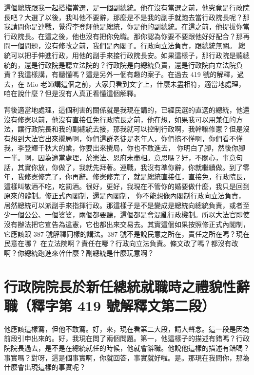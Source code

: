 \hypertarget{c08:cue:84}{}這個總統跟我一起搭檔當選，是一個副總統。他在沒有當選之前，他究竟是行政院長吧？大選了以後，我叫他不要辭，那麼是不是我的副手就跑去當行政院長呢？那我請問你是連戰，覺得李登輝他是總統，你是他的副總統。在這之前，他提拔你當行政院長。在這之後，他也沒有把你免職。那你認為你要不要跟他好好配合？那再問一個問題，沒有修改之前，我們是內閣子。行政向立法負責，跟總統無關。
\hypertarget{c08:cue:85}{}總統可以把手伸進行政，用他的副手來接行政院長安。如果這樣子，那行政院是聽總統的，還是行政院是聽立法院的？行政院是向總統負責，還是行政院向立法院負責？我這樣講，有聽懂嗎？這是另外一個有趣的案子。在過去 419 號的解釋，過去，在 Mio 老師講這個之前，大家只看到文字上，什麼未盡相符，適當地處理，咱在說什麼？但是沒有人真正看懂這個解釋。

\hypertarget{c08:cue:86}{}背後適當地處理，這個利害的關係就是我現在講的，已經民選的直選的總統，他還沒有修憲以前，他沒有直接任免行政院長之前，他在想，如果我可以用兼任的方法，讓行政院長和我的副總統去接，那我就可以控制行政啊，我幹嘛修憲？但是沒有想到大法官出來攪局啊，你們這群老徒是老年人，你們搞不懂啊，你們看不懂我，李登輝千秋大的業，你要出來攪局，你也不敢進去，
\hypertarget{c08:cue:87}{}你明白了腳，然後你腳一半。啊，因為適當處理，於憲法、恩府未盡相。意思嗎？好，不關心，事意句話，其實你放，你做了，我就先拜著。連戰，我沒有準你辭，你就繼續做。到了零年，我修憲修完了，你再辭。修憲修完了，就是總統直接任，直接免，行政院長，這樣叫敬酒不吃，吃罰酒。很好，更好，我現在不管你的婚要做什麼，我只是回到原來的體制。修正式內閣制，還是內閣制，
\hypertarget{c08:cue:88}{}你不能想像內閣制行政向立法負責，居然總統可以派副手來指揮行政。那這樣子是不是變成是總統向總統負責，或者至少一個公公、一個婆婆，兩個都要聽，這個都是會混亂行政機制。所以大法官即使沒有辦法把它宣告為違憲，它也都出來交易去。其實這個如果按照修正式內閣制，它應該跟 387 號解釋同樣的講法。387 號不是說民意之所在，責任之所在嗎？現在民意在哪？
\hypertarget{c08:cue:89}{}在立法院啊？責任在哪？行政向立法負責。條文改了嗎？都沒有改啊？你總統跑進來幹什麼？副總統是什麼玩意啊？

\section{行政院院長於新任總統就職時之禮貌性辭職（釋字第 419 號解釋文第二段）}

\hypertarget{c08:cue:90}{}他應該這樣寫，但他不敢寫。好，來，現在看第二大段，請大聲念。這一段是因為前段引申出來的。好，我現在問了兩個問題。第一，他這樣子的描述有錯嗎？行政院院長過去，是不是在總統就任的時候，他就會辭職。他說他這樣的描述有錯嗎？
\hypertarget{c08:cue:91}{}事實嗎？對呀，這是個事實啊，你就回答，事實就好啦。是。那現在我問你，那為什麼會出現這樣的事實呢？

